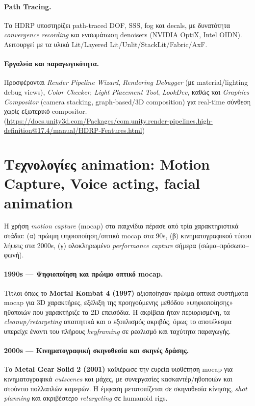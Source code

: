\paragraph{Path Tracing.} Το HDRP υποστηρίζει path-traced DOF, SSS, fog και decals, με δυνατότητα \textit{convergence recording} και ενσωμάτωση denoisers (NVIDIA OptiX, Intel OIDN). Λειτουργεί με τα υλικά Lit/Layered Lit/Unlit/StackLit/Fabric/AxF. 

\paragraph{Εργαλεία και παραγωγικότητα.} Προσφέρονται \textit{Render Pipeline Wizard}, \textit{Rendering Debugger} (με material/lighting debug views), \textit{Color Checker}, \textit{Light Placement Tool}, \textit{LookDev}, καθώς και \textit{Graphics Compositor} (camera stacking, graph-based/3D composition) για real-time σύνθεση χωρίς εξωτερικό compositor.  (\href{https://docs.unity3d.com/Packages/com.unity.render-pipelines.high-definition@17.4/manual/HDRP-Features.html}{https://docs.unity3d.com/Packages/com.unity.render-pipelines.high-definition@17.4/manual/HDRP-Features.html})

\section{Τεχνολογίες animation: Motion Capture,  Voice acting, facial animation}
Η χρήση \textit{motion capture} (mocap) στα παιχνίδια πέρασε από τρία χαρακτηριστικά στάδια: (α) πρώιμη ψηφιοποίηση/οπτικό mocap στα 90s, (β) κινηματογραφικού τύπου λήψεις στα 2000s, (γ) ολοκληρωμένο \textit{performance capture} σήμερα (σώμα–πρόσωπο–φωνή).

\paragraph{1990s — Ψηφιοποίηση και πρώιμο οπτικό mocap.}
Τίτλοι όπως το \textbf{Mortal Kombat 4 (1997)} αξιοποίησαν πρώιμα οπτικά συστήματα mocap για 3D χαρακτήρες, εξέλιξη της προηγούμενης μεθόδου «ψηφιοποίησης» ηθοποιών που χαρακτήριζε τα 2D επεισόδια. Η ακρίβεια ήταν περιορισμένη, τα \textit{cleanup/retargeting} απαιτητικά και ο εξοπλισμός ακριβός, όμως το αποτέλεσμα υπερείχε έναντι του πλήρους \textit{keyframing} σε ρεαλισμό και ταχύτητα παραγωγής.


\paragraph{2000s — Κινηματογραφική σκηνοθεσία και σκηνές δράσης.}
Το \textbf{Metal Gear Solid 2 (2001)} καθιέρωσε την ευρεία υιοθέτηση mocap για κινηματογραφικά \textit{cutscenes} και μάχες, με συνεργασίες κασκαντέρ/ηθοποιών και στούντιο πολλαπλών καμερών. Η έμφαση μετατοπίζεται σε σκηνοθεσία κίνησης, \textit{shot planning} και ακριβέστερο \textit{retargeting} σε humanoid rigs.

